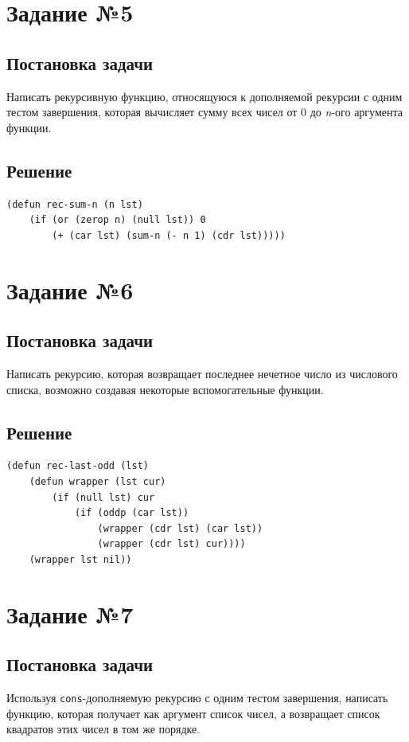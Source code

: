 \documentclass[12pt]{report}
\begin{document}
\section*{Задание №5}
\subsection*{Постановка задачи}
Написать рекурсивную функцию, относящуюся к дополняемой рекурсии с одним тестом завершения, которая вычисляет сумму всех чисел от 0 до \textit{n}-ого аргумента функции.

\subsection*{Решение}
\begin{lstlisting}
(defun rec-sum-n (n lst)
	(if (or (zerop n) (null lst)) 0
		(+ (car lst) (sum-n (- n 1) (cdr lst)))))
\end{lstlisting}

\section*{Задание №6}
\subsection*{Постановка задачи}
Написать рекурсию, которая возвращает последнее нечетное число из числового списка, возможно создавая некоторые вспомогательные функции.

\clearpage
\subsection*{Решение}
\begin{lstlisting}
(defun rec-last-odd (lst)
	(defun wrapper (lst cur)
		(if (null lst) cur
			(if (oddp (car lst))
				(wrapper (cdr lst) (car lst))
				(wrapper (cdr lst) cur))))
	(wrapper lst nil))
\end{lstlisting}

\section*{Задание №7}
\subsection*{Постановка задачи}
Используя \texttt{cons}-дополняемую рекурсию с одним тестом завершения, написать функцию, которая получает как аргумент список чисел, а возвращает список квадратов этих чисел в том же порядке.
\end{document}
